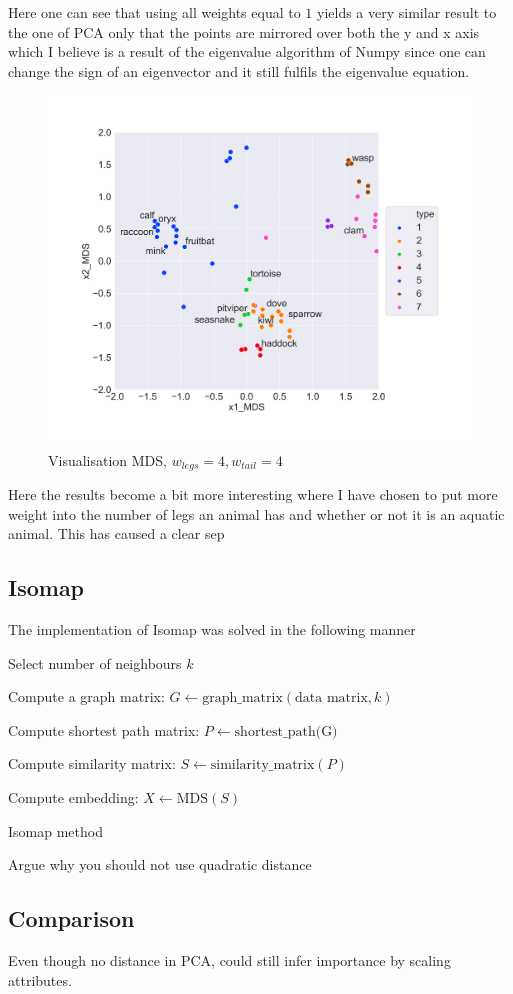 Here one can see that using all weights equal to $1$ yields a very similar result to the one of PCA only that the points are mirrored over both the y and x axis which I believe is a result of the eigenvalue algorithm of Numpy since one can change the sign of an eigenvector and it still fulfils the eigenvalue equation.
\begin{figure}[H]
  \centering
  \includegraphics[width = 0.8\linewidth]{../Visualization_MDS_with_weights.png}
  \caption{Visualisation MDS, $w_{legs} = 4, w_{tail} = 4$}
  \label{vis_PCA}
\end{figure}

Here the results become a bit more interesting where I have chosen to put more weight into the number of legs an animal has and whether or not it is an aquatic animal. This has caused a clear sep


\subsection*{Isomap}
The implementation of Isomap was solved in the following manner

\begin{algorithm}[H]
\SetAlgoLined
{}
  Select number of neighbours $k$

  Compute a graph matrix: $G \gets \text{graph\_matrix}(\text{data matrix}, k)$

  Compute shortest path matrix: $P \gets \text{shortest\_path(G)}$

  Compute similarity matrix: $S \gets \text{similarity\_matrix} (P)$

  Compute embedding: $X \gets \text{MDS}(S)$
 \caption{Isomap method}
\end{algorithm}

Argue why you should not use quadratic distance

\subsection*{Comparison}

Even though no distance in PCA, could still infer importance by scaling attributes.
